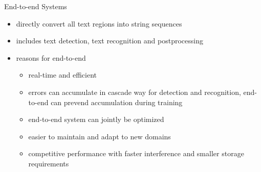 End-to-end Systems
\begin{itemize}
    \item directly convert all text regions into string sequences
    \item includes text detection, text recognition and postprocessing
    \item reasons for end-to-end
        \begin{itemize}
            \item real-time and efficient
            \item errors can accumulate in cascade way for detection and recognition, end-to-end
                can prevend accumulation during training
            \item end-to-end system can jointly be optimized
            \item easier to maintain and adapt to new domains
            \item competitive performance with faster interference and smaller storage requirements
        \end{itemize}
\end{itemize}

